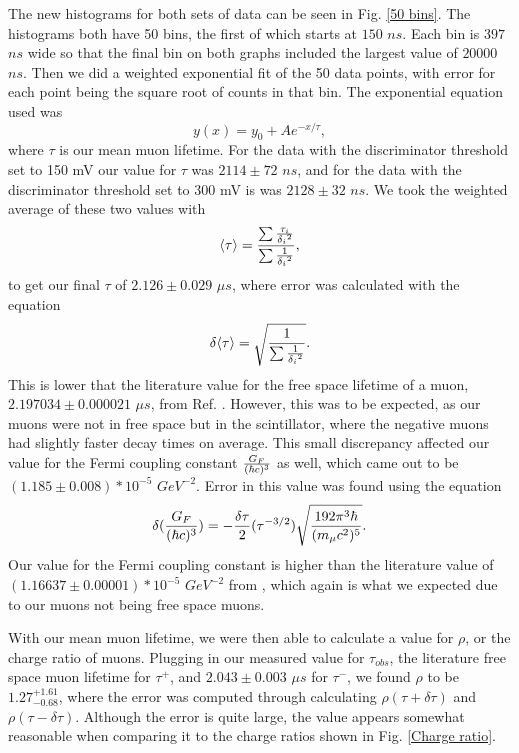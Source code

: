 \documentclass[11pt,letterpaper]{article}
\begin{document}
The new histograms for both sets of data can be seen in Fig. \ref{50 bins}. The histograms both have 50 bins, the first of which starts at $150$ $ns$. Each bin is $397$ $ns$ wide so that the final bin on both graphs included the largest value of $20000$ $ns$. Then we did a weighted exponential fit of the 50 data points, with error for each point being the square root of counts in that bin. The exponential equation used was
\begin{equation}
    y(x) = y_0 + Ae^{-x / \tau} ,
\end{equation}
where $\tau$ is our mean muon lifetime. For the data with the discriminator threshold set to 150 mV our value for $\tau$ was $2114 \pm 72$ $ns$, and for the data with the discriminator threshold set to 300 mV is was $2128 \pm 32$ $ns$. We took the weighted average of these two values with
\begin{equation}
    \langle \tau \rangle = {\sum {\tau_i \over {\delta_i}^2} \over \sum {1 \over {\delta_i}^2}} ,
\end{equation}
to get our final $\tau$ of $2.126 \pm 0.029$ $\mu s$, where error was calculated with the equation
\begin{equation}
    \delta \langle \tau \rangle = \sqrt{{1 \over \sum {1 \over {\delta_i}^2}}} .
\end{equation}
This is lower that the literature value for the free space lifetime of a muon, $2.197034 \pm 0.000021$ $\mu s$, from Ref. \cite{Balantekin}. However, this was to be expected, as our muons were not in free space but in the scintillator, where the negative muons had slightly faster decay times on average. This small discrepancy affected our value for the Fermi coupling constant ${G_F \over (\hbar c)^3}$ as well, which came out to be $(1.185 \pm 0.008) * 10^{-5}$ $GeV^{-2}$. Error in this value was found using the equation
\begin{equation}
    \delta ({G_F \over (\hbar c)^3}) = -{\delta \tau \over 2} (\tau^{-3/2}) \sqrt{{192 \pi^3 \hbar \over (m_\mu c^2)^5}}  .
\end{equation}
Our value for the Fermi coupling constant is higher than the literature value of $(1.16637 \pm 0.00001)*10^{-5}$ $GeV^{-2}$ from \cite{Balantekin}, which again is what we expected due to our muons not being free space muons.

With our mean muon lifetime, we were then able to calculate a value for $\rho$, or the charge ratio of muons. Plugging in our measured value for $\tau_{obs}$, the literature free space muon lifetime for $\tau^+$, and $2.043 \pm 0.003$ $\mu s$ for $\tau^-$, we found $\rho$ to be $1.27^{+1.61}_{-0.68}$, where the error was computed through calculating $\rho(\tau + \delta \tau)$ and $\rho(\tau - \delta \tau)$. Although the error is quite large, the value appears somewhat reasonable when comparing it to the charge ratios shown in Fig. \ref{Charge ratio}.
\end{document}
